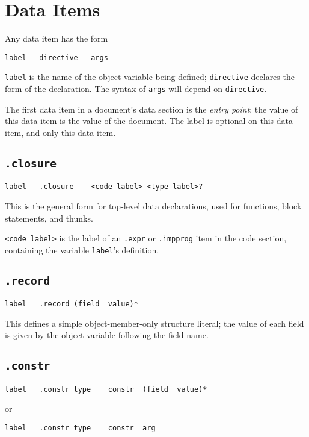 \documentclass{report}
\newcommand\stringcode[1]{\texttt{#1}}
\begin{document}
\chapter{Data Items}

Any data item has the form
\begin{verbatim}
label	directive	args
\end{verbatim}
\stringcode{label} is the name of the object variable being defined;
\stringcode{directive} declares the form of the declaration.
The syntax of \stringcode{args} will depend on \stringcode{directive}.

The first data item in a document's data section is the \emph{entry point};
the value of this data item is the value of the document.
The label is optional on this data item, and only this data item.

\section{\stringcode{.closure}}

\begin{verbatim}
label	.closure	<code label> <type label>?
\end{verbatim}

This is the general form for top-level data declarations,
used for functions, block statements, and thunks.

\stringcode{<code label>} is the label of an \stringcode{.expr} or \stringcode{.impprog} item in the code section,
containing the variable \stringcode{label}'s definition.

\section{\stringcode{.record}}

\begin{verbatim}
label	.record	(field	value)*
\end{verbatim}

This defines a simple object-member-only structure literal;
the value of each field is given by the object variable following the field name.

\section{\stringcode{.constr}}

\begin{verbatim}
label	.constr	type	constr	(field	value)*
\end{verbatim}
or
\begin{verbatim}
label	.constr	type	constr	arg
\end{verbatim}
\end{document}

